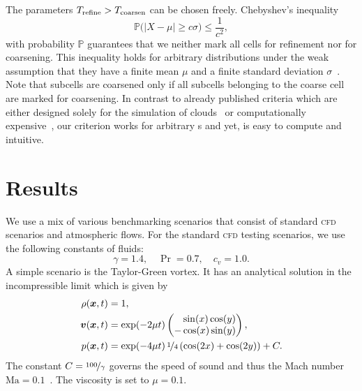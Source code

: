 \documentclass[runningheads]{llncs}
\begin{document}
The parameters $T_\text{refine} > T_\text{coarsen}$ can be chosen freely.
Chebyshev's inequality
\begin{equation}
  \label{eq:chebychev}
  \mathbb{P}\bigl(\vert X - \mu \vert \geq c \sigma \bigr) \leq \frac{1}{c^2},
\end{equation}
with probability $\mathbb{P}$ guarantees that we neither mark all cells for refinement nor for coarsening.
This inequality holds for arbitrary distributions under the weak assumption that they have a finite mean $\mu$ and a finite standard deviation $\sigma$~\cite{wasserman2004all}.
Note that subcells are coarsened only if all subcells belonging to the coarse cell are marked for coarsening.
In contrast to already published criteria which are either designed solely for the simulation of clouds~\cite{muller2010adaptive} or computationally expensive~\cite{fambri2017space}, our criterion works for arbitrary \pde{}s and yet, is easy to compute and intuitive.

\section{Results}
We use a mix of various benchmarking scenarios that consist of standard \textsc{cfd} scenarios and atmospheric flows.
%
For the standard \textsc{cfd} testing scenarios, we use the following constants of fluids:
\begin{equation}
  \gamma = 1.4, \quad \Pr = 0.7, \quad c_v = 1.0.
\end{equation}
A simple scenario is the Taylor-Green vortex.
It has an analytical solution in the incompressible limit which is given by
\begin{align}
  \label{eq:taylor-green}
  \begin{split}
  \rho(\bm{x}, t) &= 1,\\
  \bm{v}(\bm{x}, t) &= \exp(-2 \mu t)
  \begin{pmatrix}
    \phantom{-}\sin(x) \cos(y) \\
- \cos(x) \sin(y) 
    \end{pmatrix}, \\
  p(\bm{x}, t) &= \exp(-4 \mu t) \, \nicefrac{1}{4} \left( \cos(2x) + \cos(2y) \right) + C.
  \end{split}
\end{align}
The constant $C = \nicefrac{100}{\gamma}$ governs the speed of sound and thus the Mach number $\text{Ma} = 0.1$~\cite{dumbser2016high}. The viscosity is set to $\mu = 0.1$. 
\end{document}

